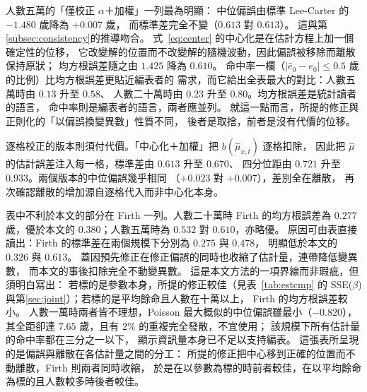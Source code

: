 \documentclass[UTF8, fontset=macnew, a4paper, 12pt]{ctexart}
\begin{document}
人數五萬的「僅校正 $\alpha$＋加權」一列最為明顯：
中位偏誤由標準 Lee-Carter 的 $-1.480$ 歲降為 $+0.007$ 歲，
而標準差完全不變（$0.613$ 對 $0.613$）。
這與第\ref{subsec:consistency}的推導吻合。
式~\eqref{eq:center} 的中心化是在估計方程上加一個確定性的位移，
它改變解的位置而不改變解的隨機波動，因此偏誤被移除而離散保持原狀；
均方根誤差隨之由 $1.425$ 降為 $0.610$。
命中率一欄（$|\hat e_0-e_0|\le0.5$ 歲的比例）比均方根誤差更貼近編表者的
需求，而它給出全表最大的對比：人數五萬時由 $0.13$ 升至 $0.58$、
人數二十萬時由 $0.23$ 升至 $0.80$。均方根誤差是統計讀者的語言，
命中率則是編表者的語言，兩者應並列。
就這一點而言，所提的修正與正則化的「以偏誤換變異數」性質不同，
後者是取捨，前者是沒有代價的位移。

逐格校正的版本則須付代價。「中心化＋加權」把 $b(\hat\mu_{x,t})$ 逐格扣除，
因此把 $\hat\mu$ 的估計誤差注入每一格，標準差由 $0.613$ 升至 $0.670$、
四分位距由 $0.721$ 升至 $0.933$。兩個版本的中位偏誤幾乎相同
（$+0.023$ 對 $+0.007$），差別全在離散，
再次確認離散的增加源自逐格代入而非中心化本身。

表中不利於本文的部分在 Firth 一列。人數二十萬時 Firth 的均方根誤差為
$0.277$ 歲，優於本文的 $0.380$；人數五萬時為 $0.532$ 對 $0.610$，亦略優。
原因可由表直接讀出：Firth 的標準差在兩個規模下分別為 $0.275$ 與 $0.478$，
明顯低於本文的 $0.326$ 與 $0.613$。
蓋因預先修正在修正偏誤的同時也收縮了估計量，連帶降低變異數，
而本文的事後扣除完全不動變異數。
這是本文方法的一項界線而非瑕疵，但須明白寫出：
若標的是參數本身，所提的修正較佳（見表~\ref{tab:estcmp} 的
SSE($\beta$) 與第\ref{sec:joint}）；若標的是平均餘命且人數在十萬以上，
Firth 的均方根誤差較小。
人數一萬時兩者皆不理想，Poisson 最大概似的中位偏誤雖最小（$-0.820$），
其全距卻達 $7.65$ 歲，且有 $2\%$ 的重複完全發散，不宜使用；
該規模下所有估計量的命中率都在三分之一以下，
顯示資訊量本身已不足以支持編表。
這張表所呈現的是偏誤與離散在各估計量之間的分工：
所提的修正把中心移到正確的位置而不動離散，Firth 則兩者同時收縮，
於是在以參數為標的時前者較佳，在以平均餘命為標的且人數較多時後者較佳。
\end{document}
